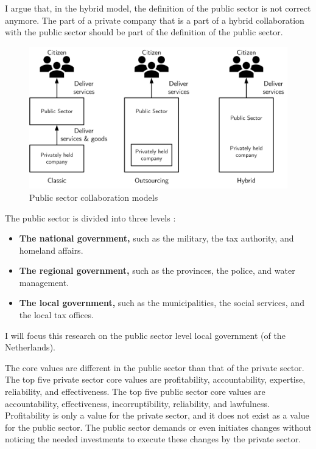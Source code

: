 I argue that, in the hybrid model, the definition of the public sector is not correct anymore. The part of a private company that is a part of a hybrid collaboration with the public sector should be part of the definition of the public sector.

\begin{figure}[H]
	\centering
	\includegraphics[width=0.7\linewidth]{images/publicsector3modelsofcolaboration}
	\caption[Public sector collaboration models]{Public sector collaboration models}
	\label{fig:publicsector3modelsofcolaboration}
\end{figure}

The public sector is divided into three levels \parencite{PrivacySense2016}:

\begin{itemize}
	\item{\textbf{The national government,} such as the military, the tax authority, and homeland affairs.}
	\item{\textbf{The regional government,} such as the provinces, the police, and water management.}
	\item{\textbf{The local government,} such as the municipalities, the social services, and the local tax offices.}
\end{itemize}

I will focus this research on the public sector level local government (of the Netherlands).

The core values are different in the public sector than that of the private sector. The top five private sector core values are profitability, accountability, expertise, reliability, and effectiveness. The top five public sector core values are accountability, effectiveness, incorruptibility, reliability, and lawfulness. \parencite{Wal2008} Profitability is only a value for the private sector, and it does not exist as a value for the public sector.  The public sector demands or even initiates changes without noticing the needed investments to execute these changes by the private sector.

